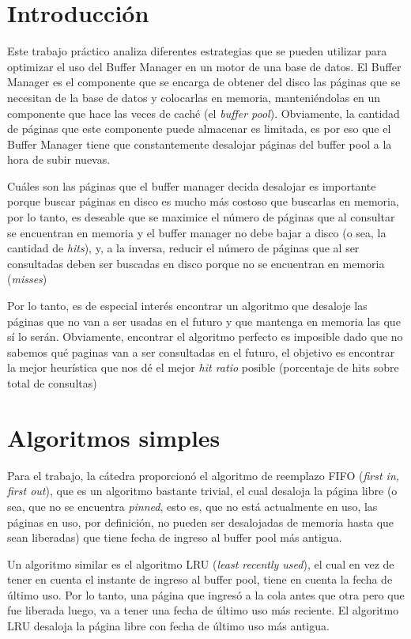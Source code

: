 \section{Introducci\'on}

Este trabajo pr\'actico analiza diferentes estrategias que se pueden utilizar para optimizar el uso del Buffer Manager en un motor de una base de datos. El Buffer Manager es el componente que se encarga de obtener del disco las p\'aginas que se necesitan de la base de datos y colocarlas en memoria, manteni\'endolas en un componente que hace las veces de cach\'e (el \textit{buffer pool}). Obviamente, la cantidad de p\'aginas que este componente puede almacenar es limitada, es por eso que el Buffer Manager tiene que constantemente desalojar p\'aginas del buffer pool a la hora de subir nuevas. 

Cu\'ales son las p\'aginas que el buffer manager decida desalojar es importante porque buscar p\'aginas en disco es mucho m\'as costoso que buscarlas en memoria, por lo tanto, es deseable que se maximice el n\'umero de p\'aginas que al consultar se encuentran en memoria y el buffer manager no debe bajar a disco (o sea, la cantidad de \textit{hits}), y, a la inversa, reducir el n\'umero de p\'aginas que al ser consultadas deben ser buscadas en disco porque no se encuentran en memoria (\textit{misses})

Por lo tanto, es de especial inter\'es encontrar un algoritmo que desaloje las p\'aginas que no van a ser usadas en el futuro y que mantenga en memoria las que s\'i lo ser\'an. Obviamente, encontrar el algoritmo perfecto es imposible dado que no sabemos qu\'e paginas van a ser consultadas en el futuro, el objetivo es encontrar la mejor heur\'istica que nos d\'e el mejor \textit{hit ratio} posible (porcentaje de hits sobre total de consultas)

\section{Algoritmos simples}

Para el trabajo, la c\'atedra proporcion\'o el algoritmo de reemplazo FIFO (\textit{first in, first out}), que es un algoritmo bastante trivial, el cual desaloja la p\'agina libre (o sea, que no se encuentra \textit{pinned}, esto es, que no est\'a actualmente en uso, las p\'aginas en uso, por definici\'on, no pueden ser desalojadas de memoria hasta que sean liberadas) que tiene fecha de ingreso al buffer pool m\'as antigua.

Un algoritmo similar es el algoritmo LRU (\textit{least recently used}), el cual en vez de tener en cuenta el instante de ingreso al buffer pool, tiene en cuenta la fecha de \'ultimo uso. Por lo tanto, una p\'agina que ingres\'o a la cola antes que otra pero que fue liberada luego, va a tener una fecha de \'ultimo uso m\'as reciente. El algoritmo LRU desaloja la p\'agina libre con fecha de \'ultimo uso m\'as antigua.

